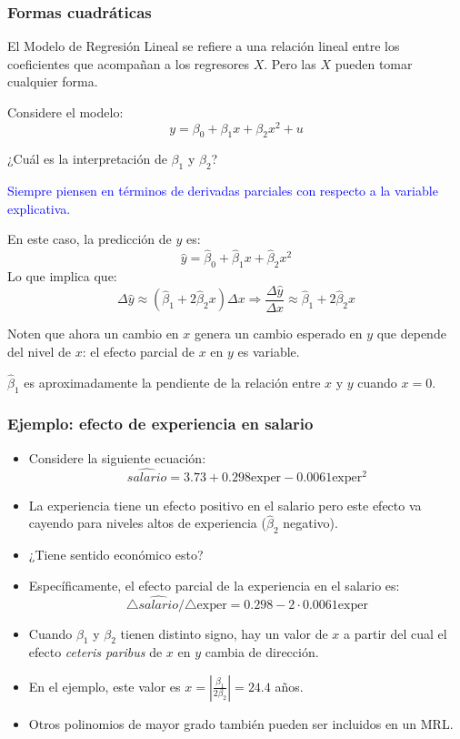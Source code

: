\documentclass{beamer}
\begin{document}
\begin{frame}[shrink=10]
\frametitle{Formas cuadráticas}

\begin{itemize}
    \item El Modelo de Regresión Lineal se refiere a una relación lineal entre los coeficientes que acompañan a los regresores $X$. Pero las $X$ pueden tomar cualquier forma.
    \item Considere el modelo:
    \[
    y = \beta_0 + \beta_1 x + \beta_2 x^2 + u
    \]
    \item ¿Cuál es la interpretación de $\beta_1$ y $\beta_2$?
    \textcolor{blue}{\item  Siempre piensen en términos de derivadas parciales con respecto a la variable explicativa.}
    \item En este caso, la predicción de $y$ es:
    \[
    \hat{y} = \hat{\beta}_0 + \hat{\beta}_1 x + \hat{\beta}_2 x^2
    \]
    Lo que implica que:
    \[
    \Delta \hat{y} \approx (\hat{\beta}_1 + 2 \hat{\beta}_2 x) \Delta x \Rightarrow \frac{\Delta \hat{y}}{\Delta x} \approx \hat{\beta}_1 + 2 \hat{\beta}_2 x
    \]
    \item Noten que ahora un cambio en $x$ genera un cambio esperado en $y$ que depende del nivel de $x$: el efecto parcial de $x$ en $y$ es variable.
    \item $\hat{\beta}_1$ es aproximadamente la pendiente de la relación entre $x$ y $y$ cuando $x = 0$.
\end{itemize}

\end{frame}
\begin{frame}
\frametitle{Ejemplo: efecto de experiencia en salario}

\begin{itemize}
    \item Considere la siguiente ecuación:
    \[
    \hat{salario} = 3.73 + 0.298\text{exper} - 0.0061\text{exper}^2
    \]
    \item La experiencia tiene un efecto positivo en el salario pero este efecto va cayendo para niveles altos de experiencia (\(\hat{\beta}_2\) negativo).
    \item ¿Tiene sentido económico esto?
    \item Específicamente, el efecto parcial de la experiencia en el salario es:
\[
\triangle \hat{salario} / \triangle \text{exper} = 0.298 - 2 \cdot 0.0061 \text{exper}
\]
    \item Cuando \(\beta_1\) y \(\beta_2\) tienen distinto signo, hay un valor de \(x\) a partir del cual el efecto \textit{ceteris paribus} de \(x\) en \(y\) cambia de dirección.
    \item En el ejemplo, este valor es \(x = \left|\frac{\beta_1}{2\beta_2}\right| = 24.4\) años.
    \item Otros polinomios de mayor grado también pueden ser incluidos en un MRL.
\end{itemize}

\end{frame}
\end{document}

